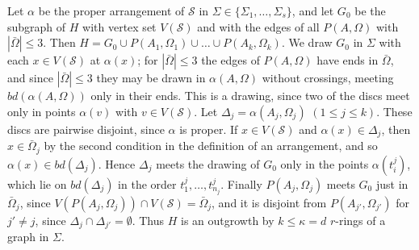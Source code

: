 {Let $\alpha$ be the proper arrangement of $\mathcal{S}$ in $\Sigma \in \{\Sigma_1, \dots, \Sigma_s\}$, and let $G_0$ be the subgraph of $H$ with vertex set $V(\mathcal{S})$ and with the edges of all $P(A, \Omega)$ with $|\bar{\Omega}| \le 3$. Then $H = G_0 \cup P(A_1, \Omega_1) \cup \dots \cup P(A_k, \Omega_k)$. We draw $G_0$ in $\Sigma$ with each $x \in V(\mathcal{S})$ at $\alpha(x)$; for $|\bar{\Omega}| \le 3$ the edges of $P(A, \Omega)$ have ends in $\bar{\Omega}$, and since $|\bar{\Omega}| \le 3$ they may be drawn in $\alpha(A, \Omega)$ without crossings, meeting $bd(\alpha(A, \Omega))$ only in their ends. This is a drawing, since two of the discs meet only in points $\alpha(v)$ with $v \in V(\mathcal{S})$. Let $\Delta_j = \alpha(A_j, \Omega_j)$ $(1 \le j \le k)$. These discs are pairwise disjoint, since $\alpha$ is proper. If $x \in V(\mathcal{S})$ and $\alpha(x) \in \Delta_j$, then $x \in \bar{\Omega}_j$ by the second condition in the definition of an arrangement, and so $\alpha(x) \in bd(\Delta_j)$. Hence $\Delta_j$ meets the drawing of $G_0$ only in the points $\alpha(t_i^j)$, which lie on $bd(\Delta_j)$ in the order $t_1^j, \dots, t_{n_j}^j$. Finally $P(A_j, \Omega_j)$ meets $G_0$ just in $\bar{\Omega}_j$, since $V(P(A_j, \Omega_j)) \cap V(\mathcal{S}) = \bar{\Omega}_j$, and it is disjoint from $P(A_{j'}, \Omega_{j'})$ for $j' \ne j$, since $\Delta_j \cap \Delta_{j'} = \emptyset$. Thus $H$ is an outgrowth by $k \le \kappa = d$ $r$-rings of a graph in $\Sigma$.}

